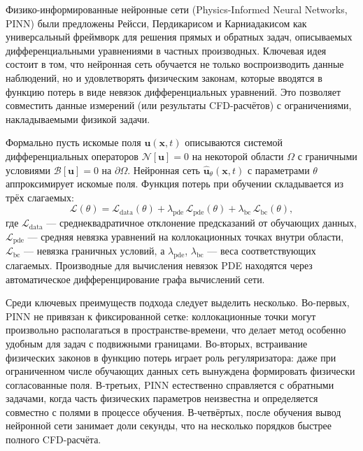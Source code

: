 \documentclass[12pt,a4paper]{article}
\begin{document}
Физико-информированные нейронные сети (Physics-Informed Neural Networks, PINN)
были предложены Рейсси, Пердикарисом и Карниадакисом \cite{Raissi2019} как
универсальный фреймворк для решения прямых и обратных задач, описываемых
дифференциальными уравнениями в частных производных. Ключевая идея состоит в
том, что нейронная сеть обучается не только воспроизводить данные наблюдений,
но и удовлетворять физическим законам, которые вводятся в функцию потерь в виде
невязок дифференциальных уравнений. Это позволяет совместить данные измерений
(или результаты CFD-расчётов) с ограничениями, накладываемыми физикой задачи.

Формально пусть искомые поля $\mathbf{u}(\mathbf{x}, t)$ описываются системой
дифференциальных операторов $\mathcal{N}[\mathbf{u}]=0$ на некоторой области
$\Omega$ с граничными условиями $\mathcal{B}[\mathbf{u}]=0$ на $\partial\Omega$.
Нейронная сеть $\hat{\mathbf{u}}_\theta(\mathbf{x}, t)$ с параметрами $\theta$
аппроксимирует искомые поля. Функция потерь при обучении складывается из трёх
слагаемых:
\begin{equation}
\mathcal{L}(\theta) = \mathcal{L}_{\mathrm{data}}(\theta)
  + \lambda_{\mathrm{pde}}\,\mathcal{L}_{\mathrm{pde}}(\theta)
  + \lambda_{\mathrm{bc}}\,\mathcal{L}_{\mathrm{bc}}(\theta),
\end{equation}
где $\mathcal{L}_{\mathrm{data}}$ --- среднеквадратичное отклонение предсказаний
от обучающих данных, $\mathcal{L}_{\mathrm{pde}}$ --- средняя невязка уравнений
на коллокационных точках внутри области, $\mathcal{L}_{\mathrm{bc}}$ ---
невязка граничных условий, а $\lambda_{\mathrm{pde}}$, $\lambda_{\mathrm{bc}}$
--- веса соответствующих слагаемых. Производные для вычисления невязок PDE
находятся через автоматическое дифференцирование графа вычислений сети.

Среди ключевых преимуществ подхода следует выделить несколько. Во-первых,
PINN не привязан к фиксированной сетке: коллокационные точки могут произвольно
располагаться в пространстве-времени, что делает метод особенно удобным для
задач с подвижными границами. Во-вторых, встраивание физических законов в
функцию потерь играет роль регуляризатора: даже при ограниченном числе
обучающих данных сеть вынуждена формировать физически согласованные поля.
В-третьих, PINN естественно справляется с обратными задачами, когда часть
физических параметров неизвестна и определяется совместно с полями в процессе
обучения. В-четвёртых, после обучения вывод нейронной сети занимает доли
секунды, что на несколько порядков быстрее полного CFD-расчёта.
\end{document}
